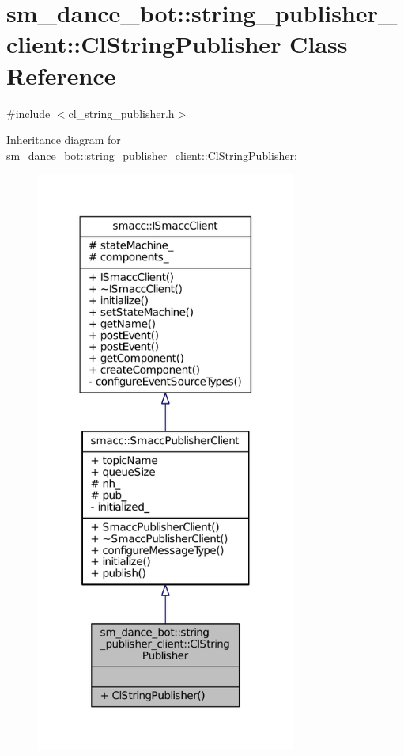 \hypertarget{classsm__dance__bot_1_1string__publisher__client_1_1ClStringPublisher}{}\section{sm\+\_\+dance\+\_\+bot\+:\+:string\+\_\+publisher\+\_\+client\+:\+:Cl\+String\+Publisher Class Reference}
\label{classsm__dance__bot_1_1string__publisher__client_1_1ClStringPublisher}


{\ttfamily \#include $<$cl\+\_\+string\+\_\+publisher.\+h$>$}



Inheritance diagram for sm\+\_\+dance\+\_\+bot\+:\+:string\+\_\+publisher\+\_\+client\+:\+:Cl\+String\+Publisher\+:
\nopagebreak
\begin{figure}[H]
\begin{center}
\leavevmode
\includegraphics[width=242pt]{classsm__dance__bot_1_1string__publisher__client_1_1ClStringPublisher__inherit__graph}
\end{center}
\end{figure}


